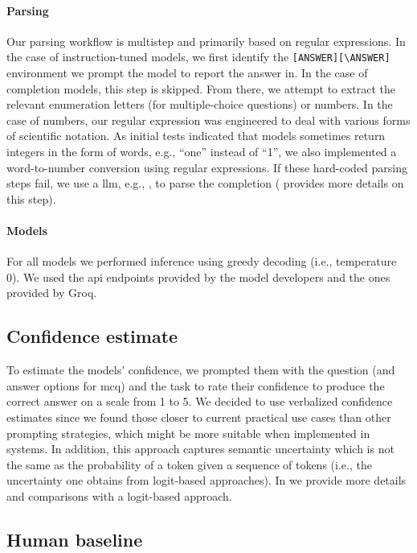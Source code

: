 \documentclass[11pt, oneside]{article}
\begin{document}
\begin{refsection}
\paragraph{Parsing}
Our parsing workflow is multistep and primarily based on regular expressions.
In the case of instruction-tuned models, we first identify the \texttt{[ANSWER]}\texttt{[\textbackslash ANSWER]} environment we prompt the model to report the answer in.
In the case of completion models, this step is skipped. From there, we attempt to extract the relevant enumeration letters (for multiple-choice questions) or numbers.
In the case of numbers, our regular expression was engineered to deal with various forms of scientific notation.
As initial tests indicated that models sometimes return integers in the form of words, e.g., \enquote{one} instead of \enquote{1}, we also implemented a word-to-number conversion using regular expressions.
If these hard-coded parsing steps fail, we use a \gls{llm}, e.g., \ClaudeThreeFiveSonnet, to parse the completion ( provides more details on this step).


\paragraph{Models}
For all models we performed inference using greedy decoding (i.e., temperature 0). We used the \gls{api} endpoints provided by the model developers and the ones provided by Groq.

\subsection{Confidence estimate}
To estimate the models' confidence, we prompted them with the question (and answer options for \gls{mcq}) and the task to rate their confidence to produce the correct answer on a scale from 1 to 5.
We decided to use verbalized confidence estimates\autocite{xiong2023llms} since we found those closer to current practical use cases than other prompting strategies, which might be more suitable when implemented in systems. In addition, this approach captures semantic uncertainty which is not the same as the probability of a token given a sequence of tokens (i.e., the uncertainty one obtains from logit-based approaches). In  we provide more details and comparisons with a logit-based approach.

\subsection{Human baseline}


\end{refsection}
\end{document}
